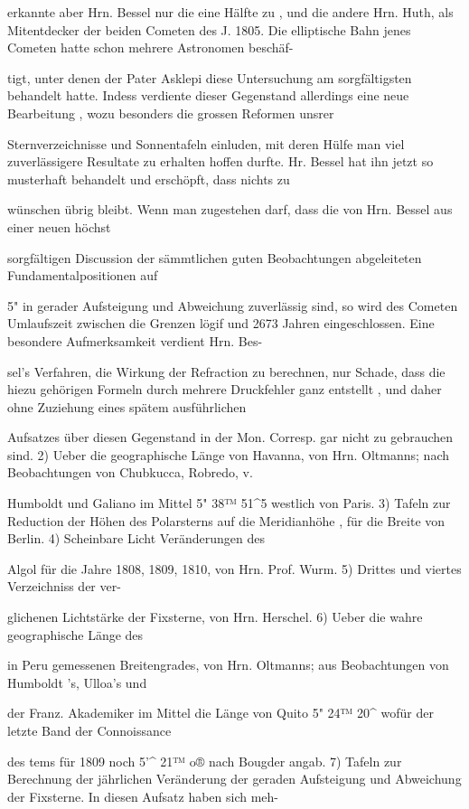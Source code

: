 \documentclass[10pt,a4paper]{article}
\begin{document}
erkannte aber Hrn. Bessel nur die eine Hälfte zu , und die andere Hrn. Huth, als Mitentdecker der beiden Cometen des J. 1805. Die elliptische Bahn jenes Cometen hatte schon mehrere Astronomen beschäf-

tigt, unter denen der Pater Asklepi diese Untersuchung am sorgfältigsten behandelt hatte. Indess verdiente dieser Gegenstand allerdings eine neue Bearbeitung , wozu besonders die grossen Reformen unsrer

Sternverzeichnisse und Sonnentafeln einluden, mit deren Hülfe man viel zuverlässigere Resultate zu erhalten hoffen durfte. Hr. Bessel hat ihn jetzt so musterhaft behandelt und erschöpft, dass nichts zu

wünschen übrig bleibt. Wenn man zugestehen darf, dass die von Hrn. Bessel aus einer neuen höchst

sorgfältigen Discussion der sämmtlichen guten Beobachtungen abgeleiteten Fundamentalpositionen auf

5" in gerader Aufsteigung und Abweichung zuverlässig sind, so wird des Cometen Umlaufszeit zwischen die Grenzen lögif und 2673 Jahren eingeschlossen. Eine besondere Aufmerksamkeit verdient Hrn. Bes-

sel's Verfahren, die Wirkung der Refraction zu berechnen, nur Schade, dass die hiezu gehörigen Formeln durch mehrere Druckfehler ganz entstellt , und daher ohne Zuziehung eines spätem ausführlichen

Aufsatzes über diesen Gegenstand in der Mon. Corresp. gar nicht zu gebrauchen sind. 2) Ueber die geographische Länge von Havanna, von Hrn. Oltmanns; nach Beobachtungen von Chubkucca, Robredo, v.

Humboldt und Galiano im Mittel 5" 38™ 51\textasciicircum{}5 westlich von Paris. 3) Tafeln zur Reduction der Höhen des Polarsterns auf die Meridianhöhe , für die Breite von Berlin. 4) Scheinbare Licht Veränderungen des

Algol für die Jahre 1808, 1809, 1810, von Hrn. Prof. Wurm. 5) Drittes und viertes Verzeichniss der ver-

glichenen Lichtstärke der Fixsterne, von Hrn. Herschel. 6) Ueber die wahre geographische Länge des

in Peru gemessenen Breitengrades, von Hrn. Oltmanns; aus Beobachtungen von Humboldt 's, Ulloa's und

der Franz. Akademiker im Mittel die Länge von Quito 5" 24™ 20\textasciicircum{} wofür der letzte Band der Connoissance

des tems für 1809 noch 5'\textasciicircum{} 21™ o® nach Bougder angab. 7) Tafeln zur Berechnung der jährlichen Veränderung der geraden Aufsteigung und Abweichung der Fixsterne. In diesen Aufsatz haben sich meh-
\end{document}
